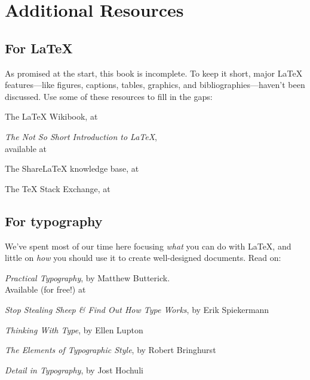 \setlength\parskip{0.75\baselineskip}
\setlength\parindent{0pt}

\chapter{Additional Resources}
\label{resources}

\section{For \texorpdfstring{\LaTeX}{LaTeX}}

As promised at the start, this book is incomplete.
To keep it short,
major \LaTeX{} features---like figures, captions, tables, graphics,
and bibliographies---haven't been discussed.
Use some of these resources to fill in the gaps:
\begin{leftfigure}
The \LaTeX{} Wikibook, at 

\textit{The Not So Short Introduction to \LaTeX}, \\
available at 

The Share\LaTeX{} knowledge base, at 

The \TeX{} Stack Exchange, at 
\end{leftfigure}

\section{For typography}

We've spent most of our time here focusing \emph{what} you can do with \LaTeX,
and little on \emph{how} you should use it to create well-designed documents.
Read on:
\begin{leftfigure}
\textit{Practical Typography}, by Matthew Butterick. \\
Available (for free!) at 

\textit{Stop Stealing Sheep \& Find Out How Type Works}, by Erik Spiekermann

\textit{Thinking With Type}, by Ellen Lupton

\textit{The Elements of Typographic Style}, by Robert Bringhurst

\textit{Detail in Typography}, by Jost Hochuli
\end{leftfigure}

\backmatter

